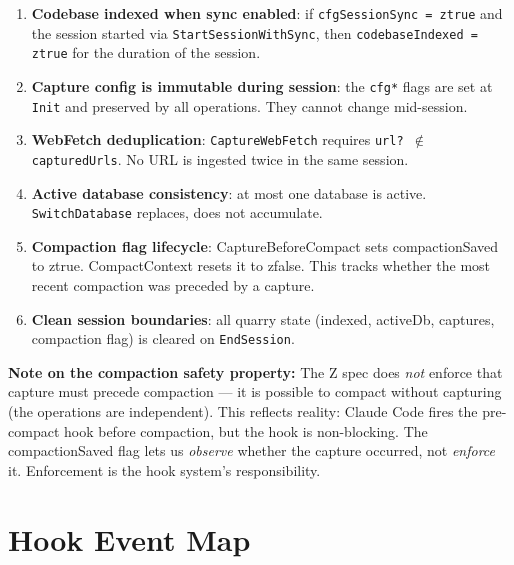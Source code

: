 \documentclass[a4paper,10pt,fleqn]{article}
\begin{document}
\begin{enumerate}
  \item \textbf{Codebase indexed when sync enabled}: if
    \texttt{cfgSessionSync = ztrue} and the session started via
    \texttt{StartSessionWithSync}, then
    \texttt{codebaseIndexed = ztrue} for the duration of the session.

  \item \textbf{Capture config is immutable during session}: the
    \texttt{cfg*} flags are set at \texttt{Init} and preserved by
    all operations. They cannot change mid-session.

  \item \textbf{WebFetch deduplication}: \texttt{CaptureWebFetch}
    requires \texttt{url? $\notin$ capturedUrls}. No URL is ingested
    twice in the same session.

  \item \textbf{Active database consistency}: at most one database
    is active. \texttt{SwitchDatabase} replaces, does not accumulate.

  \item \textbf{Compaction flag lifecycle}:
    CaptureBeforeCompact sets compactionSaved to ztrue.
    CompactContext resets it to zfalse.  This tracks whether
    the most recent compaction was preceded by a capture.

  \item \textbf{Clean session boundaries}: all quarry state
    (indexed, activeDb, captures, compaction flag) is cleared on
    \texttt{EndSession}.
\end{enumerate}

\textbf{Note on the compaction safety property:} The Z spec
does \emph{not} enforce that capture must precede compaction
--- it is possible to compact without capturing (the operations
are independent).  This reflects reality: Claude Code fires
the pre-compact hook before compaction, but the hook is
non-blocking.  The compactionSaved flag lets us \emph{observe}
whether the capture occurred, not \emph{enforce} it.
Enforcement is the hook system's responsibility.

\section{Hook Event Map}
\end{document}
